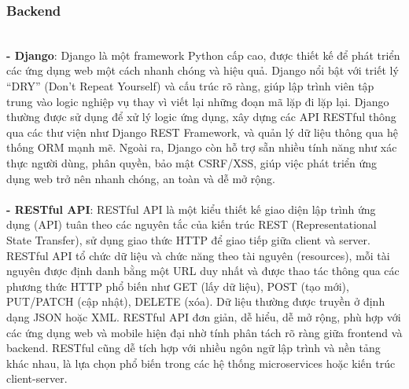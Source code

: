 \documentclass[a4paper,12pt]{article}
\begin{document}
\subsubsection{Backend} \\
 \textbf{- Django}:  Django là một framework Python cấp cao, được thiết kế để phát triển các ứng dụng web một cách nhanh chóng và hiệu quả. Django nổi bật với triết lý “DRY” (Don’t Repeat Yourself) và cấu trúc rõ ràng, giúp lập trình viên tập trung vào logic nghiệp vụ thay vì viết lại những đoạn mã lặp đi lặp lại. Django thường được sử dụng để xử lý logic ứng dụng, xây dựng các API RESTful thông qua các thư viện như Django REST Framework, và quản lý dữ liệu thông qua hệ thống ORM mạnh mẽ. Ngoài ra, Django còn hỗ trợ sẵn nhiều tính năng như xác thực người dùng, phân quyền, bảo mật CSRF/XSS, giúp việc phát triển ứng dụng web trở nên nhanh chóng, an toàn và dễ mở rộng.\\ \\ 
 \textbf{- RESTful API}: RESTful API là một kiểu thiết kế giao diện lập trình ứng dụng (API) tuân theo các nguyên tắc của kiến trúc REST (Representational State Transfer), sử dụng giao thức HTTP để giao tiếp giữa client và server. RESTful API tổ chức dữ liệu và chức năng theo tài nguyên (resources), mỗi tài nguyên được định danh bằng một URL duy nhất và được thao tác thông qua các phương thức HTTP phổ biến như GET (lấy dữ liệu), POST (tạo mới), PUT/PATCH (cập nhật), DELETE (xóa). Dữ liệu thường được truyền ở định dạng JSON hoặc XML. RESTful API đơn giản, dễ hiểu, dễ mở rộng, phù hợp với các ứng dụng web và mobile hiện đại nhờ tính phân tách rõ ràng giữa frontend và backend. RESTful cũng dễ tích hợp với nhiều ngôn ngữ lập trình và nền tảng khác nhau, là lựa chọn phổ biến trong các hệ thống microservices hoặc kiến trúc client-server.\\  
\end{document}
